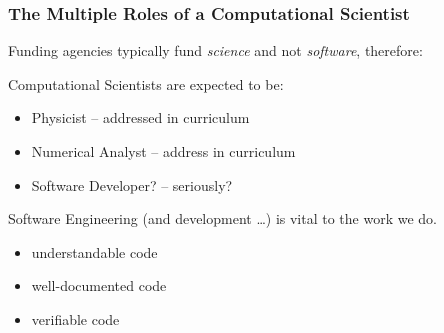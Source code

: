 \documentclass[mathserif]{beamer}
\begin{document}
\begin{frame}
\frametitle{The Multiple Roles of a Computational Scientist} 

Funding agencies typically fund {\em science} and not {\em software},  therefore: \\

\begin{block}{Computational Scientists are expected to be:}
\begin{itemize}
\item Physicist -- addressed in curriculum
\item Numerical Analyst -- address in curriculum
\item Software Developer? -- seriously? 
\end{itemize}
\end{block}

{\color{pecos2}Software Engineering} (and development \ldots) {\color{pecos2}is vital to the work we do.}
\begin{itemize}
\item understandable code
\item well-documented code
\item verifiable code
\end{itemize}
\begin{center}
\small
{}
\end{center}
\end{frame}
\end{document}
